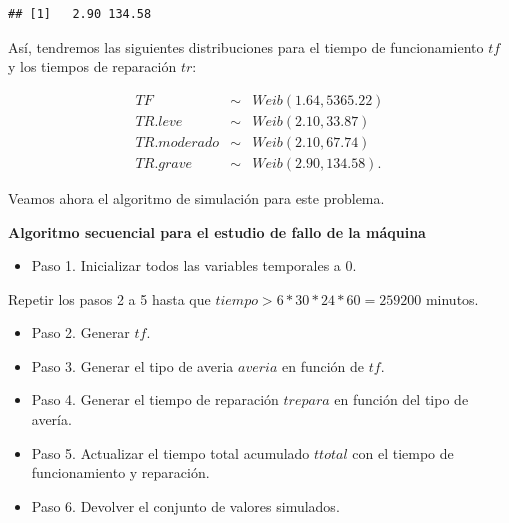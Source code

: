\documentclass[
]{book}
\providecommand{\tightlist}{%
  \setlength{\itemsep}{0pt}\setlength{\parskip}{0pt}}
\newenvironment{silverbox}{
  \definecolor{shadecolor}{rgb}{192, 192, 192}  
  \color{black}
  \begin{shaded}}
 {\end{shaded}}
\theoremstyle{definition}
\theoremstyle{definition}
\theoremstyle{definition}
\theoremstyle{definition}
\theoremstyle{remark}
\begin{document}
\begin{verbatim}
## [1]   2.90 134.58
\end{verbatim}

Así, tendremos las siguientes distribuciones para el tiempo de funcionamiento \(tf\) y los tiempos de reparación \(tr\):

\begin{eqnarray*}
TF &\sim& Weib(1.64,5365.22) \\
TR.leve &\sim& Weib(2.10, 33.87)  \\
TR.moderado &\sim& Weib(2.10, 67.74)  \\
TR.grave &\sim& Weib(2.90, 134.58).  
\end{eqnarray*}

Veamos ahora el algoritmo de simulación para este problema.

\begin{silverbox}

\textbf{Algoritmo secuencial para el estudio de fallo de la máquina}

\begin{itemize}
\tightlist
\item
  Paso 1. Inicializar todos las variables temporales a 0.
\end{itemize}

Repetir los pasos 2 a 5 hasta que \(tiempo > 6*30*24*60 = 259200\) minutos.

\begin{itemize}
\item
  Paso 2. Generar \(tf\).\\
\item
  Paso 3. Generar el tipo de averia \(averia\) en función de \(tf\).
\item
  Paso 4. Generar el tiempo de reparación \(trepara\) en función del tipo de avería.
\item
  Paso 5. Actualizar el tiempo total acumulado \(ttotal\) con el tiempo de funcionamiento y reparación.
\item
  Paso 6. Devolver el conjunto de valores simulados.
\end{itemize}

\end{silverbox}
\end{document}
